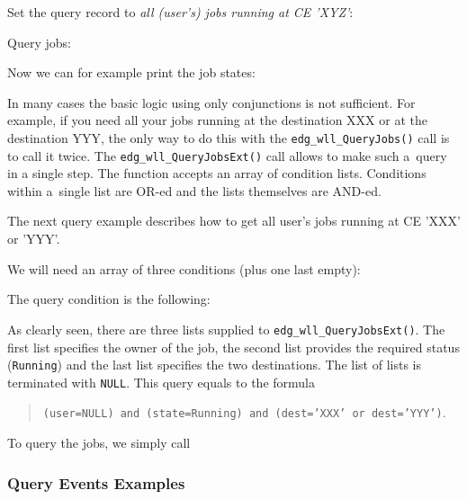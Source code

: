Set the query record to \emph{all (user's) jobs running at CE 'XYZ'}:


Query jobs:


Now we can for example print the job states:



In many cases the basic logic using only conjunctions is not sufficient.
For example, if you need all your jobs running at the destination XXX or at
the destination YYY, the only way to do this with the \texttt{edg\_wll\_QueryJobs()}
call is to call it twice. The \texttt{edg\_wll\_QueryJobsExt()} call allows to make
such a~query in a single step.
The function accepts an array of condition lists. Conditions within a~single list are
OR-ed and the lists themselves are AND-ed.

The next query example describes how to get all user's jobs running at
CE 'XXX' or 'YYY'. 

We will need an array of three conditions (plus one last empty):



The query condition is the following:



As clearly seen, there are three lists supplied to
\texttt{edg\_wll\_QueryJobsExt()}. The first list specifies the owner of the
job, the second list provides the required status (\texttt{Running}) and
the last list specifies the two destinations.
The list of lists is terminated with \texttt{NULL}.
This query equals to the formula
\begin{quote}
\texttt{(user=NULL) and (state=Running) and (dest='XXX' or dest='YYY')}.
\end{quote}

To query the jobs, we simply call




\subsubsection{Query Events Examples}

